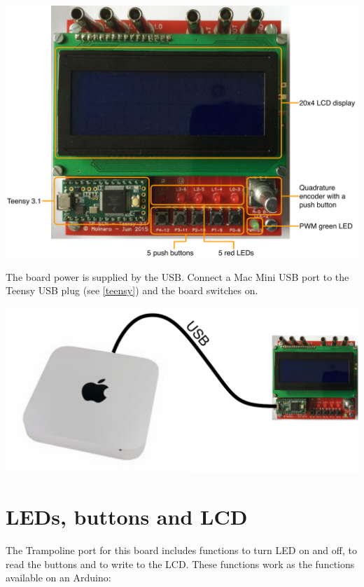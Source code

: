 \documentclass[11pt]{report}
\begin{document}
\begin{center}
\noindent\includegraphics[scale=0.45]{labsboard.pdf}
\end{center}

The board power is supplied by the USB. Connect a Mac Mini USB  port to the Teensy USB plug (see \ref{teensy}) and the board switches on.

\begin{center}
\noindent\includegraphics[scale=0.35]{connect.pdf}
\end{center}

\section{LEDs, buttons and LCD}

The Trampoline port for this board includes functions to turn LED on and off, to read the buttons and to write to the LCD. These functions work as the functions available on an Arduino:
\end{document}
